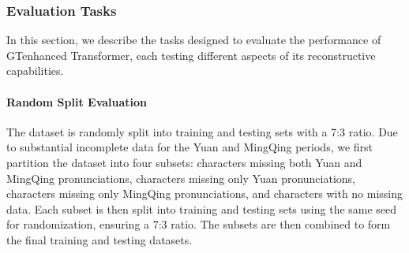 
\subsubsection{Evaluation Tasks}

In this section, we describe the tasks designed to evaluate the performance of GTenhanced Transformer, each testing different aspects of its reconstructive capabilities.

\paragraph{Random Split Evaluation} The dataset is randomly split into training and testing sets with a 7:3 ratio. Due to substantial incomplete data for the Yuan and MingQing periods, we first partition the dataset into four subsets: characters missing both Yuan and MingQing pronunciations, characters missing only Yuan pronunciations, characters missing only MingQing pronunciations, and characters with no missing data. Each subset is then split into training and testing sets using the same seed for randomization, ensuring a 7:3 ratio. The subsets are then combined to form the final training and testing datasets.

